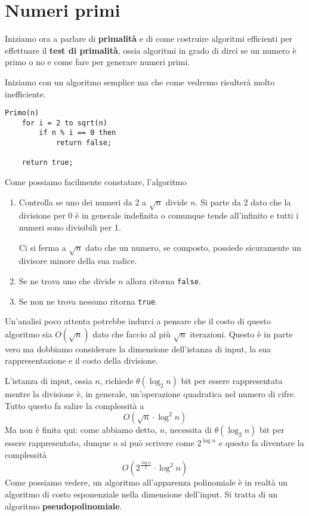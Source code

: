 \chapter{Numeri primi}\label{primi}
Iniziamo ora a parlare di \textbf{primalit\`a} e di come costruire algoritmi efficienti per effettuare il
\textbf{test di primalit\`a}, ossia algoritmi in grado di dirci se un numero \`e primo o no e come fare per generare
numeri primi.

Iniziamo con un algoritmo semplice ma che come vedremo risulter\`a molto inefficiente.
\begin{lstlisting}[style=pseudo-style]
Primo(n)
	for i = 2 to sqrt(n)
		if n % i == 0 then
			return false;
	
	return true;
\end{lstlisting}
Come possiamo facilmente constatare, l'algoritmo
\begin{enumerate}
	\item Controlla se uno dei numeri da 2 a $\sqrt{n}$ divide $n$. Si parte da 2 dato che la divisione per 0 \`e in
	      generale indefinita o comunque tende all'infinito e tutti i numeri sono divisibili per 1.

	      Ci si ferma a $\sqrt{n}$ dato che un numero, se composto, possiede sicuramente un divisore minore della sua
	      radice.
	\item Se ne trova uno che divide $n$ allora ritorna \verb|false|.
	\item Se non ne trova nessuno ritorna \verb|true|.
\end{enumerate}
Un'analisi poco attenta potrebbe indurci a pensare che il costo di questo algoritmo sia $O(\sqrt{n})$ dato che faccio al
pi\`u $\sqrt{n}$ iterazioni. Questo \`e in parte vero ma dobbiamo considerare la dimensione dell'istanza di input, la
sua rappresentazione e il costo della divisione.

L'istanza di input, ossia $n$, richiede $\theta(\log_2 n)$ bit per essere rappresentata mentre la divisione \`e, in
generale, un'operazione quadratica nel numero di cifre. Tutto questo fa salire la complessit\`a a
\[ O(\sqrt{n} \cdot \log^2 n) \]
Ma non \`e finita qui: come abbiamo detto, $n$, necessita di $\theta(\log_2 n)$ bit per essere rappresentato, dunque $n$
si pu\`o scrivere come $2^{\log n}$ e questo fa diventare la complessit\`a
\[ O(2^\frac{\log n}{2} \cdot \log^2 n) \]
Come possiamo vedere, un algoritmo all'apparenza polinomiale \`e in realt\`a un algoritmo di costo esponenziale nella
dimensione dell'input. Si tratta di un algoritmo \textbf{pseudopolinomiale}.

